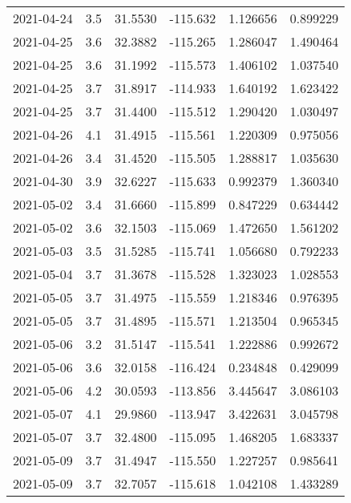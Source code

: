 \begin{tabular}{lrrrrr}
2021-04-24 &       3.5 &  31.5530 &  -115.632 &         1.126656 &         0.899229 \\
2021-04-25 &       3.6 &  32.3882 &  -115.265 &         1.286047 &         1.490464 \\
2021-04-25 &       3.6 &  31.1992 &  -115.573 &         1.406102 &         1.037540 \\
2021-04-25 &       3.7 &  31.8917 &  -114.933 &         1.640192 &         1.623422 \\
2021-04-25 &       3.7 &  31.4400 &  -115.512 &         1.290420 &         1.030497 \\
2021-04-26 &       4.1 &  31.4915 &  -115.561 &         1.220309 &         0.975056 \\
2021-04-26 &       3.4 &  31.4520 &  -115.505 &         1.288817 &         1.035630 \\
2021-04-30 &       3.9 &  32.6227 &  -115.633 &         0.992379 &         1.360340 \\
2021-05-02 &       3.4 &  31.6660 &  -115.899 &         0.847229 &         0.634442 \\
2021-05-02 &       3.6 &  32.1503 &  -115.069 &         1.472650 &         1.561202 \\
2021-05-03 &       3.5 &  31.5285 &  -115.741 &         1.056680 &         0.792233 \\
2021-05-04 &       3.7 &  31.3678 &  -115.528 &         1.323023 &         1.028553 \\
2021-05-05 &       3.7 &  31.4975 &  -115.559 &         1.218346 &         0.976395 \\
2021-05-05 &       3.7 &  31.4895 &  -115.571 &         1.213504 &         0.965345 \\
2021-05-06 &       3.2 &  31.5147 &  -115.541 &         1.222886 &         0.992672 \\
2021-05-06 &       3.6 &  32.0158 &  -116.424 &         0.234848 &         0.429099 \\
2021-05-06 &       4.2 &  30.0593 &  -113.856 &         3.445647 &         3.086103 \\
2021-05-07 &       4.1 &  29.9860 &  -113.947 &         3.422631 &         3.045798 \\
2021-05-07 &       3.7 &  32.4800 &  -115.095 &         1.468205 &         1.683337 \\
2021-05-09 &       3.7 &  31.4947 &  -115.550 &         1.227257 &         0.985641 \\
2021-05-09 &       3.7 &  32.7057 &  -115.618 &         1.042108 &         1.433289 \\

\end{tabular}
